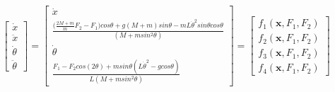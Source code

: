 \documentclass[../main.tex]{subfiles}
\begin{document}
\begin{equation}
\begin{bmatrix} \dot{x} \\ \ddot{x} \\ \dot{\theta} \\ \ddot{\theta} \end{bmatrix}  =
\begin{bmatrix} \dot{x} \\ \frac{\big(\frac{2M+m}{m}F_2-F_1\big)cos\theta + g(M+m)sin\theta - mL\dot{\theta}^2 sin\theta cos\theta}{(M + m sin^2\theta)} \\ \dot{\theta} \\ \frac{F_1 - F_2cos(2\theta)+ msin\theta(L\dot{\theta}^2-g cos\theta)}{L(M+m sin^2\theta)} \end{bmatrix} =
\begin{bmatrix} f_1(\boldsymbol{x}, F_1, F_2) \\ f_2(\boldsymbol{x}, F_1, F_2) \\ f_3(\boldsymbol{x}, F_1, F_2) \\ f_4(\boldsymbol{x}, F_1, F_2) \end{bmatrix}
\end{equation}
\end{document}

